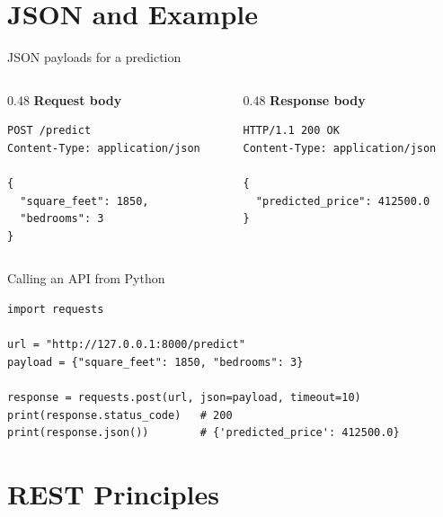\documentclass[aspectratio=169,10pt]{beamer}
\begin{document}
\section{JSON and Example}

\begin{frame}[fragile]{JSON payloads for a prediction}
\begin{columns}[T]
\begin{column}{0.48\textwidth}
\textbf{Request body}
\begin{lstlisting}[numbers=none]
POST /predict
Content-Type: application/json

{
  "square_feet": 1850,
  "bedrooms": 3
}
\end{lstlisting}
\end{column}
\begin{column}{0.48\textwidth}
\textbf{Response body}
\begin{lstlisting}[numbers=none]
HTTP/1.1 200 OK
Content-Type: application/json

{
  "predicted_price": 412500.0
}
\end{lstlisting}
\end{column}
\end{columns}
\end{frame}

\begin{frame}[fragile]{Calling an API from Python}
\begin{lstlisting}
import requests

url = "http://127.0.0.1:8000/predict"
payload = {"square_feet": 1850, "bedrooms": 3}

response = requests.post(url, json=payload, timeout=10)
print(response.status_code)   # 200
print(response.json())        # {'predicted_price': 412500.0}
\end{lstlisting}
\end{frame}

\section{REST Principles}
\end{document}
